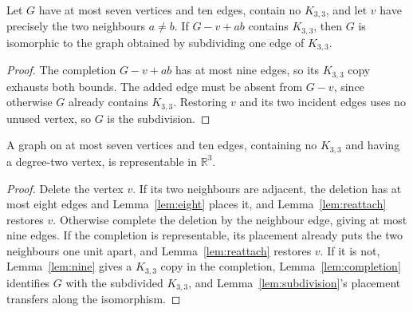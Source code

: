 \begin{lemma}
  \label{lem:completion}
  \leanok
  Let $G$ have at most seven vertices and ten edges, contain no $K_{3,3}$, and let $v$ have
  precisely the two neighbours $a \ne b$. If $G - v + ab$ contains $K_{3,3}$, then $G$ is
  isomorphic to the graph obtained by subdividing one edge of $K_{3,3}$.
\end{lemma}
\begin{proof}
  The completion $G - v + ab$ has at most nine edges, so its $K_{3,3}$ copy exhausts both
  bounds. The added edge must be absent from $G - v$, since otherwise $G$ already contains
  $K_{3,3}$. Restoring $v$ and its two incident edges uses no unused vertex, so $G$ is the
  subdivision.
\end{proof}

\begin{lemma}
  \label{lem:degree-two}
  \leanok
  A graph on at most seven vertices and ten edges, containing no $K_{3,3}$ and having a
  degree-two vertex, is representable in $\mathbb{R}^3$.
\end{lemma}
\begin{proof}
  Delete the vertex $v$. If its two neighbours are adjacent, the deletion has at most eight
  edges and Lemma~\ref{lem:eight} places it, and Lemma~\ref{lem:reattach} restores $v$.
  Otherwise complete the deletion by the neighbour edge, giving at most nine edges. If the
  completion is representable, its placement already puts the two neighbours one unit apart,
  and Lemma~\ref{lem:reattach} restores $v$. If it is not, Lemma~\ref{lem:nine} gives a
  $K_{3,3}$ copy in the completion, Lemma~\ref{lem:completion} identifies $G$ with the
  subdivided $K_{3,3}$, and Lemma~\ref{lem:subdivision}'s placement transfers along the
  isomorphism.
\end{proof}

